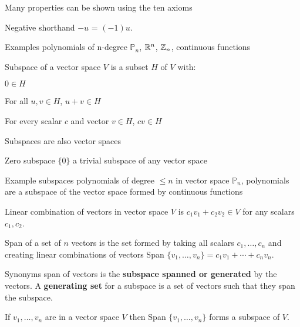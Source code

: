     \begin{card}
    \begin{compactdesc}
    \item[Many properties] can be shown using the ten axioms
    \item[Negative] shorthand $-u$ = $(-1)u$.
    \item[Examples] polynomials of n-degree $\mathbb{P}_n$, $\mathbb{R}^n$, $\mathbb{Z}_n$, continuous functions
    \item[Subspace] of a vector space $V$ is a subset $H$ of $V$ with:
    \begin{compactenum}
    \item $0 \in H$
    \item For all $u, v \in H$, $u + v \in H$
    \item For every scalar $c$ and vector $v \in H$, $cv \in H$
    \end{compactenum}

    \item[Subspaces are also] vector spaces
    \item[Zero subspace] $\{0\}$ a trivial subspace of any vector space
    \item[Example subspaces] polynomials of degree $\leq n$ in vector space $\mathbb{P}_n$,
        polynomials are a subspace of the vector space formed by continuous functions
    \item[Linear combination] of vectors in vector space $V$ is
        $c_1v_1 + c_2v_2 \in V$ for any scalars $c_1, c_2$.
    \item[Span] of a set of $n$ vectors is the set formed by taking all scalars
    $c_1, \dotsc, c_n$ and creating linear combinations of vectors
    Span $\{v_1, \dotsc, v_n \} = c_1 v_1 + \dotsb + c_n v_n$.
    \item[Synonyms] span of vectors is the \textbf{subspace spanned or generated} by
        the vectors. A \textbf{generating set} for a subspace is a set of vectors
        such that they span the subspace.
    \end{compactdesc}

    \begin{theorem}
    If $v_1, \dotsc, v_n$ are in a vector space $V$ then Span $\{v_1, \dotsc, v_n \}$
    forms a subspace of $V$.
    \end{theorem}
\end{card}



